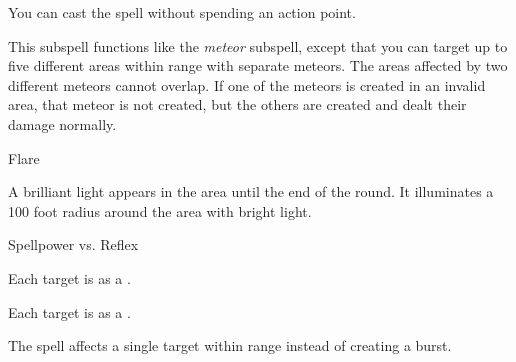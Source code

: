 You can cast the spell without spending an action point.






This subspell functions like the \textit{meteor} subspell, except that you can target up to five different areas within range with separate meteors.
The areas affected by two different meteors cannot overlap.
If one of the meteors is created in an invalid area, that meteor is not created, but the others are created and dealt their damage normally.





\newpage
\begin{spellsection}{Flare}

\begin{spellcontent}

\begin{spelltargetinginfo}




\end{spelltargetinginfo}


\begin{spelleffects}



\spelleffect
A brilliant light appears in the area until the end of the round.
It illuminates a 100 foot radius around the area with bright light.




\begin{spellattack}{Spellpower vs. Reflex}


\spellsuccess
Each target is \dazzled as a .



\spellcritical
Each target is \blinded as a .



\end{spellattack}





\end{spelleffects}

\end{spellcontent}
\begin{spellfooter}


\end{spellfooter}
\begin{spellsubcontent}


\begin{spellcantrip}
The spell affects a single target within range instead of creating a burst.
\end{spellcantrip}


\end{spellsubcontent}
\end{spellsection}


